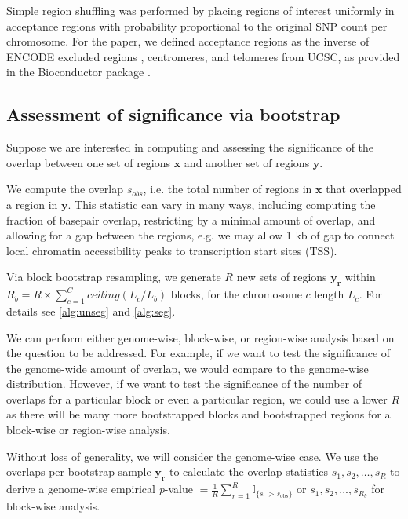 \documentclass{article}
\begin{document}
Simple region shuffling was performed by placing regions of interest
uniformly in acceptance regions with probability proportional to the
original SNP count per chromosome. For the paper, we defined
acceptance regions as the inverse of
ENCODE excluded regions   ,
centromeres, and telomeres from UCSC,
as provided in the  Bioconductor package
\citep{excluderanges}.

\subsection{Assessment of significance via bootstrap}

Suppose we are interested in computing and assessing the significance
of the overlap between one set of regions
$\bm{x}$ and another set of regions $\bm{y}$.

We compute the overlap $s_{obs}$, i.e. the total number of 
regions in $\bm{x}$ that overlapped a region in $\bm{y}$.
This statistic can vary in many ways, including computing the fraction of
basepair overlap, restricting by a minimal amount of overlap, and
allowing for a gap between the regions, e.g. we may allow 1 kb of gap
to connect local chromatin accessibility peaks to transcription start
sites (TSS).

Via block bootstrap resampling, we generate $R$ new
sets of regions $\bm{y_r}$ within $R_b = R \times \sum_{c=1}^{C} ceiling(L_c / L_b)$ blocks, for the chromosome $c$ length $L_c$.
For details see \cref{alg:unseg} and \cref{alg:seg}.

We can perform either genome-wise, block-wise, or region-wise analysis
based on the question to be addressed. For example, if we want to test
the significance of the genome-wide amount of overlap, we would compare
to the genome-wise distribution. However, if we want to
test the significance of the number of overlaps for a particular
block or even a particular region, we could use a lower $R$ as there
will be many more bootstrapped blocks and bootstrapped regions for a
block-wise or region-wise analysis.

Without loss of generality, we will consider the genome-wise case.
We use the overlaps per bootstrap sample $\bm{y_r}$ to calculate the
overlap statistics $s_{1}, s_{2}, \dots, s_{R}$
to derive a genome-wise empirical \textit{p}-value
$= \frac{1}{R} \sum_{r=1}^R \mathbb{I}_{\{s_r > s_\text{obs}\}}$ or
$s_{1}, s_{2},..., s_{R_b}$ for block-wise analysis.
\end{document}
